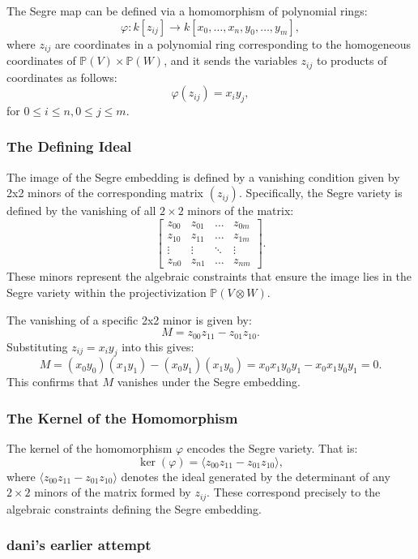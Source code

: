 The Segre map can be defined via a homomorphism of polynomial rings:
\[
\varphi: k[z_{ij}] \to k[x_0, \dots, x_n, y_0, \dots, y_m],
\]
where \( z_{ij} \) are coordinates in a polynomial ring corresponding to the homogeneous coordinates of \( \mathbb{P}(V) \times \mathbb{P}(W) \), and it sends the variables \( z_{ij} \) to products of coordinates as follows:
\[
\varphi(z_{ij}) = x_i y_j,
\]
for \( 0 \le i \le n, 0 \le j \le m \).

\subsubsection*{The Defining Ideal}

The image of the Segre embedding is defined by a vanishing condition given by 2x2 minors of the corresponding matrix \( (z_{ij}) \). Specifically, the Segre variety is defined by the vanishing of all \( 2 \times 2 \) minors of the matrix: \[
\begin{bmatrix}
z_{00} & z_{01} & \dots & z_{0m} \\
z_{10} & z_{11} & \dots & z_{1m} \\
\vdots & \vdots & \ddots & \vdots \\
z_{n0} & z_{n1} & \dots & z_{nm}
\end{bmatrix}.
\]
These minors represent the algebraic constraints that ensure the image lies in the Segre variety within the projectivization \( \mathbb{P}(V \otimes W) \).

The vanishing of a specific 2x2 minor is given by:
\[
M = z_{00} z_{11} - z_{01} z_{10}.
\]
Substituting \( z_{ij} = x_i y_j \) into this gives:
\[
M = (x_0 y_0)(x_1 y_1) - (x_0 y_1)(x_1 y_0) = x_0 x_1 y_0 y_1 - x_0 x_1 y_0 y_1 = 0.
\]
This confirms that \( M \) vanishes under the Segre embedding.

\subsubsection*{The Kernel of the Homomorphism}

The kernel of the homomorphism \( \varphi \) encodes the Segre variety. That is:
\[
\ker(\varphi) = \langle z_{00} z_{11} - z_{01} z_{10} \rangle,
\]
where \( \langle z_{00} z_{11} - z_{01} z_{10} \rangle \) denotes the ideal generated by the determinant of any \( 2 \times 2 \) minors of the matrix formed by \( z_{ij} \). These correspond precisely to the algebraic constraints defining the Segre embedding.

\subsubsection*{dani's earlier attempt}

